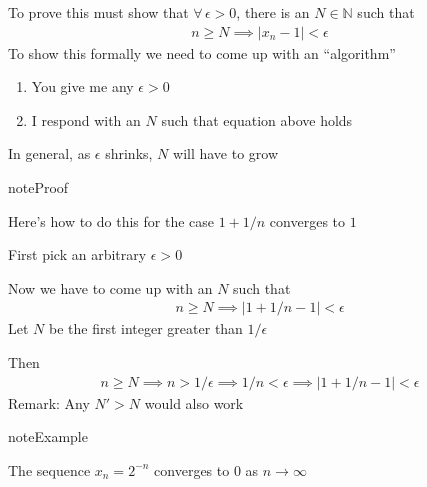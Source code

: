 \documentclass[letterpaper,10pt,english]{jupyterBook}
\begin{document}
\sphinxAtStartPar
To prove this must show that \(\forall \, \epsilon > 0\), there is an \(N \in \mathbb{N}\) such that
\begin{equation*}
\begin{split}
n \geq N
\implies
|x_n - 1| < \epsilon
\end{split}
\end{equation*}
\sphinxAtStartPar
To show this formally we need to come up with an  “algorithm”
\begin{enumerate}
%
\item {} 
\sphinxAtStartPar
You give me any \(\epsilon > 0\)

\item {} 
\sphinxAtStartPar
I respond with an \(N\) such that equation above holds

\end{enumerate}

\sphinxAtStartPar
In general, as \(\epsilon\) shrinks, \(N\) will have to grow

\begin{sphinxadmonition}{note}{Proof}

\sphinxAtStartPar
Here’s how to do this for the case \(1 + 1/n\) converges to \(1\)

\sphinxAtStartPar
First pick an arbitrary \(\epsilon > 0\)

\sphinxAtStartPar
Now we have to come up with an \(N\) such that
\begin{equation*}
\begin{split}
n \geq N
\implies
|1 + 1/n - 1| < \epsilon
\end{split}
\end{equation*}
\sphinxAtStartPar
Let \(N\) be the first integer greater than \( 1/\epsilon\)

\sphinxAtStartPar
Then
\begin{equation*}
\begin{split}
n \geq N 
\implies n > 1/\epsilon 
\implies 1/n < \epsilon 
\implies |1 + 1/n - 1| < \epsilon 
\end{split}
\end{equation*}
\sphinxAtStartPar
Remark: Any \(N' > N\) would also work
\end{sphinxadmonition}

\begin{sphinxadmonition}{note}{Example}

\sphinxAtStartPar
The sequence \(x_n = 2^{-n}\) converges to \(0\) as \(n \to \infty\)
\end{sphinxadmonition}
\end{document}
